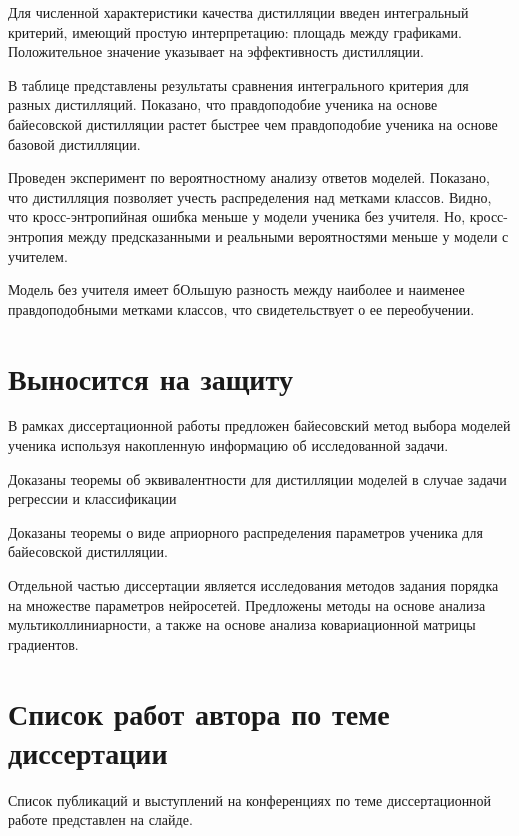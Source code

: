 \documentclass[10pt, twoside]{article}
\begin{document}
Для численной характеристики качества дистилляции введен интегральный критерий, имеющий простую интерпретацию: площадь между графиками. Положительное значение указывает на эффективность дистилляции.

В таблице представлены результаты сравнения интегрального критерия для разных дистилляций. Показано, что правдоподобие ученика на основе байесовской дистилляции растет быстрее чем правдоподобие ученика на основе базовой дистилляции.

Проведен эксперимент по вероятностному анализу ответов моделей. Показано, что дистилляция позволяет учесть распределения над метками классов. Видно, что кросс-энтропийная ошибка меньше у модели ученика без учителя. Но, кросс-энтропия между предсказанными и реальными вероятностями меньше у модели с учителем.

Модель без учителя имеет бОльшую разность между наиболее и наименее правдоподобными метками классов, что свидетельствует о ее переобучении.

\section{Выносится на защиту}
В рамках диссертационной работы предложен байесовский метод выбора моделей ученика используя накопленную информацию об исследованной задачи.

Доказаны теоремы об эквивалентности для дистилляции моделей в случае задачи регрессии и классификации

Доказаны теоремы о виде априорного распределения параметров ученика для байесовской дистилляции.

Отдельной частью диссертации является исследования методов задания порядка на множестве параметров нейросетей. Предложены методы на основе анализа мультиколлиниарности, а также на основе анализа ковариационной матрицы градиентов.

\section{Список работ автора по теме диссертации}
Список публикаций и выступлений на конференциях по теме диссертационной работе представлен на слайде.
\end{document}
